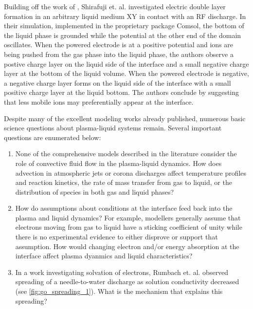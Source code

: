 Building off the work of \cite{morrow2011time}, Shirafuji et. al. investigated electric double layer formation in an arbitrary liquid medium XY in contact with an RF discharge. \cite{shirafuji2014numerical} In their simulation, implemented in the proprietary package Comsol, the bottom of the liquid phase is grounded while the potential at the other end of the domain oscillates. When the powered electrode is at a positive potential and ions are being pushed from the gas phase into the liquid phase, the authors observe a postive charge layer on the liquid side of the interface and a small negative charge layer at the bottom of the liquid volume. When the powered electrode is negative, a negative charge layer forms on the liquid side of the interface with a small positive charge layer at the liquid bottom. The authors conclude by suggesting that less mobile ions may preferentially appear at the interface.

Despite many of the excellent modeling works already published, numerous basic science questions about plasma-liquid systems remain. Several important questions are enumerated below:

\begin{enumerate}
\item \label{itm:advection} None of the comprehensive models described in the literature consider the role of convective fluid flow in the plasma-liquid dynamics. How does advection in atmospheric jets or corona discharges affect temperature profiles and reaction kinetics, the rate of mass transfer from gas to liquid, or the distribution of species in both gas and liquid phases?
\item \label{itm:interface} How do assumptions about conditions at the interface feed back into the plasma and liquid dynamics? For example, modellers \cite{Tian2014,shirafuji2014numerical} generally assume that electrons moving from gas to liquid have a sticking coefficient of unity while there is no experimental evidence to either disprove or support that assumption. How would changing electron and/or energy absorption at the interface affect plasma dyanmics and liquid characteristics?
\item \label{itm:spreading} In a work investigating solvation of electrons, Rumbach et. al. \cite{rumbach2015solvation} observed spreading of a needle-to-water discharge as solution conductivity decreased (see \cref{fig:go_spreading_1}). What is the mechanism that explains this spreading?
\end{enumerate}

